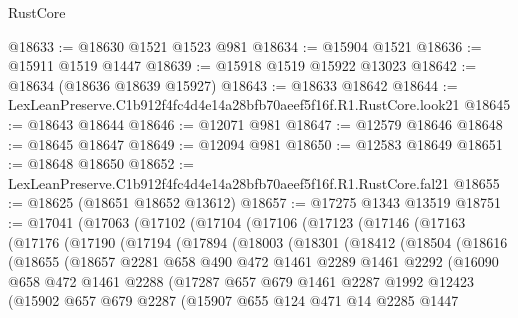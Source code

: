 \begin{lexlean}{RustCore}
\begin{coremodule}
@18633 := @18630 @1521 @1523 @981
@18634 := @15904 @1521
@18636 := @15911 @1519 @1447
@18639 := @15918 @1519 @15922 @13023
@18642 := @18634 (@18636 @18639 @15927)
@18643 := @18633 @18642
@18644 := LexLeanPreserve.C1b912f4fc4d4e14a28bfb70aeef5f16f.R1.RustCore.look21
@18645 := @18643 @18644
@18646 := @12071 @981
@18647 := @12579 @18646
@18648 := @18645 @18647
@18649 := @12094 @981
@18650 := @12583 @18649
@18651 := @18648 @18650
@18652 := LexLeanPreserve.C1b912f4fc4d4e14a28bfb70aeef5f16f.R1.RustCore.fal21
@18655 := @18625 (@18651 @18652 @13612)
@18657 := @17275 @1343 @13519
@18751 := @17041
    (@17063
      (@17102
        (@17104
          (@17106
            (@17123
              (@17146
                (@17163
                  (@17176
                    (@17190
                      (@17194
                        (@17894
                          (@18003
                            (@18301
                              (@18412
                                (@18504
                                  (@18616
                                    (@18655
                                      (@18657
                                        @2281
                                        @658
                                        @490
                                        @472
                                        @1461
                                        @2289
                                        @1461
                                        @2292
                                        (@16090
                                          @658
                                          @472
                                          @1461
                                          @2288
                                          (@17287
                                            @657
                                            @679
                                            @1461
                                            @2287
                                            @1992
                                            @12423
                                            (@15902
                                              @657
                                              @679
                                              @2287
                                              (@15907
                                                @655
                                                @124
                                                @471
                                                @14
                                                @2285
                                                @1447

\end{coremodule}
\end{lexlean}
